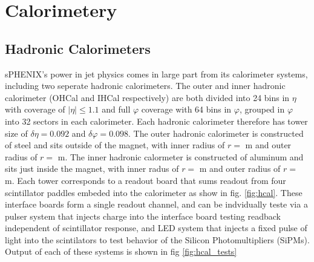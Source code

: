 \documentclass[letterpaper, 12pt, oneside]{book}
\theoremstyle{definition}
\begin{document}
\section{Calorimetery}
	\subsection{Hadronic Calorimeters}
		sPHENIX's power in jet physics comes in large part from its calorimeter systems, including two seperate hadronic calorimeters. 
		The outer and inner hadronic calorimeter (OHCal and IHCal respectively) are both divided into 24 bins in $\eta$ with coverage of $|\eta| \leq 1.1$  and full $\varphi$ coverage with 64 bins in $\varphi$, grouped in $\varphi$ into 32 sectors in each calorimeter. 
		Each hadronic calorimeter therefore has tower size of $\delta \eta = 0.092$ and $\delta \varphi=0.098$.  
		The outer hadronic calorimeter is constructed of steel and sits outside of the magnet, with inner radius of $r=$ m and outer radius of $r=$ m. 
		The inner hadronic calormeter is constructed of aluminum and sits just inside the magnet, with inner radus of $r=$ m and outer radius of $r=$ m. 
		Each tower corresponds to a readout board that sums readout from four scintillator paddles embeded into the calorimeter as show in fig. \ref{fig:hcal}. 
		These interface boards form a single readout channel, and can be indvidually teste via a pulser system that injects charge into the interface board testing readback independent of scintillator response, and LED system that injects a fixed pulse of light into the scintilators to test behavior of the Silicon Photomultipliers (SiPMs). 
		Output of each of these systems is shown in fig \ref{fig:hcal_tests}
\end{document}
